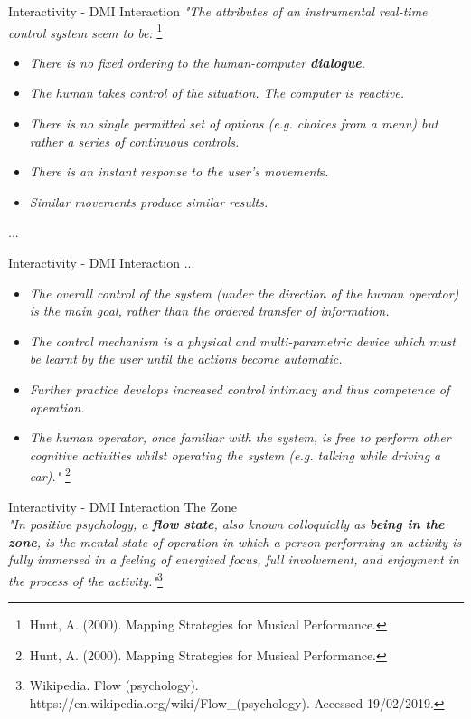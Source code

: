 \documentclass{beamer}
\newcommand\blfootnote[1]{%
  \begingroup
  \renewcommand\thefootnote{}\footnote{#1}%
  \addtocounter{footnote}{-1}%
  \endgroup
}
\begin{document}
\begin{frame}{Interactivity - DMI Interaction} 
\textit{"The attributes of an instrumental real-time control system seem to be:}\blfootnote{Hunt, A. (2000). Mapping Strategies for Musical Performance.}
\begin{itemize}
    \item \textit{There is no fixed ordering to the human-computer \textbf{dialogue}.}
    \item \textit{The human takes control of the situation. The computer is reactive.}
    \item \textit{There is no single permitted set of options (e.g. choices from a menu) but rather a series of continuous controls.}
    \item \textit{There is an instant response to the user's movement}s.
    \item \textit{Similar movements produce similar results.}
\end{itemize}
...
\end{frame}

\begin{frame}{Interactivity - DMI Interaction} 
...
\begin{itemize}
    \item \textit{The overall control of the system (under the direction of the human operator) is the main goal, rather than the ordered transfer of information.}
    \item \textit{The control mechanism is a physical and multi-parametric device which must be learnt by the user until the actions become automatic.}
    \item \textit{Further practice develops increased control intimacy and thus competence of operation.}
    \item \textit{The human operator, once familiar with the system, is free to perform other cognitive activities whilst operating the system (e.g. talking while driving a car)."}\blfootnote{Hunt, A. (2000). Mapping Strategies for Musical Performance.}
\end{itemize}
\end{frame}


\begin{frame}{Interactivity - DMI Interaction} 
    The Zone\\
    \vspace{5mm}
    \textit{"In positive psychology, a \textbf{flow state}, also known colloquially as \textbf{being in the zone}, is the mental state of operation in which a person performing an activity is fully immersed in a feeling of energized focus, full involvement, and enjoyment in the process of the activity."}\footnote{Wikipedia. Flow (psychology). https://en.wikipedia.org/wiki/Flow\_(psychology). Accessed 19/02/2019.}
\end{frame}
\end{document}

